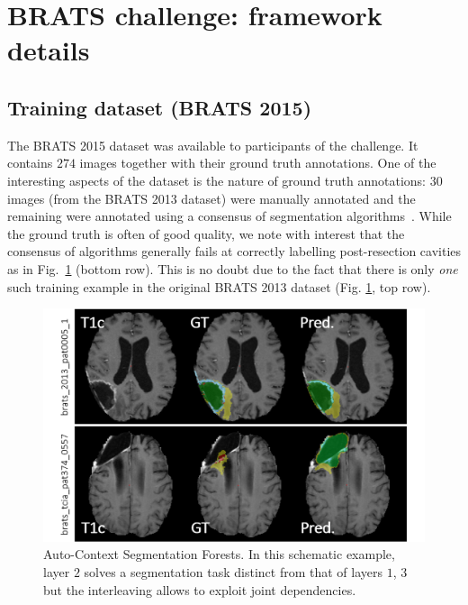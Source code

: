 
\section{BRATS challenge: framework details}

\subsection{Training dataset (BRATS 2015)}

The BRATS 2015 dataset was available to participants of the challenge. 
It contains $274$ images together with their ground truth annotations. 
One of the interesting aspects of the dataset is the nature of ground truth annotations: $30$ images 
(from the BRATS 2013 dataset) were manually annotated and the remaining were annotated using a consensus of 
segmentation algorithms~\cite{cite-brats-paper}. 
While the ground truth is often of good quality, we note with interest that the consensus of algorithms generally fails at correctly labelling post-resection cavities as in Fig.~\ref{fig:post-resection-cavities} (bottom row). This is no doubt due to the fact that there is only \textit{one} such training example in the original BRATS 2013 dataset (Fig. \ref{fig:post-resection-cavities}, top row). 

\begin{figure}
\centering
\includegraphics[width=1\textwidth]{images/BRATS2015_post-resection-cavities.png}
\caption{Auto-Context Segmentation Forests. In this schematic example, layer $2$ solves a segmentation task distinct from that of layers $1$, $3$ but the interleaving allows to exploit joint dependencies.}
\label{fig:post-resection-cavities}
\end{figure}

